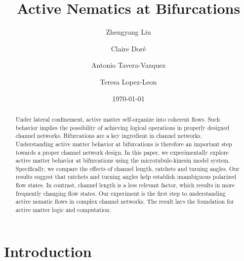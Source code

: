 \documentclass[%
10pt,
superscriptaddress,
twocolumn,
 amsmath,amssymb,
 aps,prx,
]{revtex4-2}
\begin{document}

\title{Active Nematics at Bifurcations}%

\author{Zhengyang Liu}
\author{Claire Doré}

\author{Antonio Tavera-Vazquez}

\author{Teresa Lopez-Leon}
\date{\today}


\begin{abstract}

Under lateral confinement, active matter self-organize into coherent flows. 
Such behavior implies the possibility of achieving logical operations in properly designed channel networks. 
Bifurcations are a key ingredient in channel networks.
Understanding active matter behavior at bifurcations is therefore an important step towards a proper channel network design.
In this paper, we experimentally explore active matter behavior at bifurcations using the microtubule-kinesin model system. 
Specifically, we compare the effects of channel length, ratchets and turning angles. 
Our results suggest that ratchets and turning angles help establish unambiguous polarized flow states.
In contrast, channel length is a less relevant factor, which results in more frequently changing flow states.
Our experiment is the first step to understanding active nematic flows in complex channel networks.
The result lays the foundation for active matter logic and computation.

\end{abstract}


\maketitle

\section{Introduction}
\end{document}
